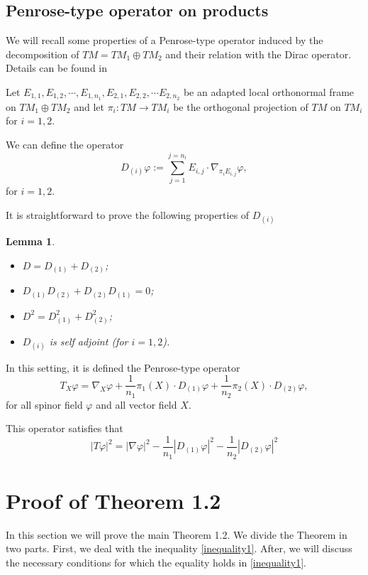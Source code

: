 \documentclass[11pt]{amsart}
\theoremstyle{plain}
\newtheorem{lemma}[theorem]{Lemma}
\numberwithin{equation}{section}
\theoremstyle{plain}
\begin{document}
\subsection{Penrose-type operator on products}

We will recall some properties of a Penrose-type operator induced by the decomposition of $TM=TM_1\oplus TM_2$  and their relation with the Dirac operator. Details can be found in \cite{Alex}


Let $E_{1,1},E_{1,2},\cdots,E_{1,n_1},E_{2,1},E_{2,2},\cdots E_{2,n_2}$ be an adapted local orthonormal frame on $TM_1\oplus TM_2$ and let $\pi_i:TM\rightarrow TM_i$ be the orthogonal projection of $TM$ on $TM_i$ for $i=1,2$.

We can define the operator $$D_{(i)}\varphi:= \sum_{j=1}^{j=n_i}E_{i,j}\cdot\nabla_{\pi_iE_{i,j}} \varphi,$$
for $i=1,2$.

It is straightforward to prove the following properties of $D_{(i)}$

\begin{lemma}
\begin{itemize}
\item [(1)] $D=D_{(1)}+D_{(2)}$;
\item [(2)]$D_{(1)}D_{(2)}+D_{(2)}D_{(1)}=0$;
\item [(3)]$D^2=D^2_{(1)}+D^2_{(2)}$;
\item [(4)]$D_{(i)}$ is self adjoint (for $i=1,2$). 
\end{itemize}

\end{lemma}

In this setting, it is defined the Penrose-type operator $$T_X\varphi=\nabla_X\varphi +\frac{1}{n_1}\pi_1(X)\cdot D_{(1)}\varphi+\frac{1}{n_2}\pi_2(X)\cdot D_{(2)}\varphi,$$
for all spinor field $\varphi$ and all vector field $X$.

This operator satisfies that \begin{equation}\label{decompositionT}
|T\varphi|^2=|\nabla\varphi|^2-\frac{1}{n_1}|D_{(1)}\varphi|^2-\frac{1}{n_2}|D_{(2)}\varphi|^2
\end{equation}



\section{Proof of Theorem 1.2}
In this section we will prove the main Theorem 1.2. We divide the Theorem in two parts.
First, we deal with the inequality \eqref{inequality1}. After, we will discuss the necessary conditions for which the equality holds in \eqref{inequality1}. 
\end{document}
